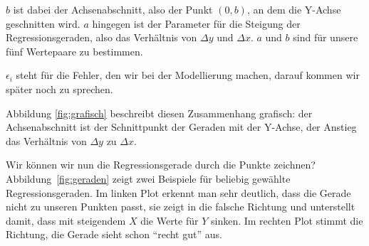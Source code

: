 \documentclass[ngerman, 12pt]{scrartcl}
\begin{document}
\(b\) ist dabei der Achsenabschnitt, also der Punkt \((0,b)\), an dem die Y-Achse geschnitten wird. $a$ hingegen ist der Parameter für die Steigung der Regressionsgeraden, also das Verhältnis von $\Delta y$ und $\Delta x$. $a$ und $b$ sind für unsere fünf Wertepaare zu bestimmen. 

\(\epsilon_i\) steht für die Fehler, den wir bei der Modellierung machen, darauf kommen wir später noch zu sprechen. 

Abbildung \ref{fig:grafisch} beschreibt diesen Zusammenhang grafisch: der Achsenabschnitt ist der Schnittpunkt der Geraden mit der Y-Achse, der Anstieg das Verhältnis von \(\Delta y\) zu \(\Delta x\).

Wir können wir nun die Regressionsgerade durch die Punkte zeichnen? Abbildung~\ref{fig:geraden} zeigt zwei Beispiele für beliebig gewählte Regressionsgeraden. Im linken Plot erkennt man sehr deutlich, dass die Gerade nicht zu unseren Punkten passt, sie zeigt in die falsche Richtung und unterstellt damit, dass mit steigendem $X$ die Werte für $Y$ sinken. Im rechten Plot stimmt die Richtung, die Gerade sieht schon \enquote{recht gut} aus. 

\label{fig:geraden}
\end{document}
